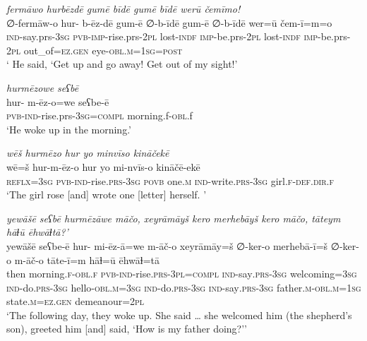 \ea \label{ŠJ.37}
\textit{fermāwo hurbēzdē gumē bīdē gumē bīdē werū čemīmo!} \\ 
\gll ∅-fermāw-o hur- b-ēz-dē gum-ē ∅-b-īdē gum-ē ∅-b-īdē wer=ū čem-ī=m=o \\ 
 \textsc{ind-}say.prs\textsc{-3sg} \textsc{pvb-}\textsc{imp-}rise.prs-\textsc{2pl} lost\textsc{-indf} \textsc{imp-}be.prs-\textsc{2pl} lost\textsc{-indf} \textsc{imp-}be.prs-\textsc{2pl} out\_of\textsc{=ez.gen} eye\textsc{-obl}\textsc{.m}\textsc{=\textsc{1sg}}\textsc{=\textsc{post}} \\ 
\glt ` He said, ‘Get up and go away! Get out of my sight!'
\z 
 
\ea \label{ŠJ.47}
\textit{hurmēzowe seʕbē} \\ 
\gll hur- m-ēz-o=we seʕbe-ē \\ 
 \textsc{pvb-}\textsc{ind-}rise.prs\textsc{-3sg}\textsc{=compl} morning.f\textsc{-obl}.f \\ 
\glt `He woke up in the morning.'
\z 
 
\ea \label{KŠ.79}
\textit{wēš hurmēzo hur yo minvīso kināčekē} \\ 
\gll wē=š hur-m-ēz-o hur yo mi-nvīs-o kināčē-ekē \\ 
 \textsc{reflx}\textsc{=3sg} \textsc{pvb-}\textsc{ind-}rise\textsc{.prs}\textsc{-3sg} \textsc{povb} one\textsc{.m} \textsc{ind-}write\textsc{.prs}\textsc{-3sg} girl\textsc{.f}\textsc{-def}\textsc{.dir}\textsc{.f} \\ 
\glt `The girl rose [and] wrote one [letter] herself. '
\z 
 
\ea \label{KŠ.81}
\textit{yewāšē seʕbē hurmēzāwe māčo, xeyrāmāyš kero merhebāyš kero māčo, tāteym hāɫū ēhwāɫtā?’} \\ 
\gll yewāšē seʕbe-ē hur- mi-ēz-ā=we m-āč-o xeyrāmāy=š ∅-ker-o merhebā-ī=š ∅-ker-o m-āč-o tāte-ī=m hāɫ=ū ēhwāɫ=tā \\ 
 then morning\textsc{.f}\textsc{-obl}\textsc{.f} \textsc{pvb-}\textsc{ind-}rise\textsc{.prs}\textsc{-3pl}\textsc{=compl} \textsc{ind-}say\textsc{.prs}\textsc{-3sg} welcoming\textsc{=3sg} \textsc{ind-}do\textsc{.prs}\textsc{-3sg} hello\textsc{-obl}\textsc{.m}\textsc{=3sg} \textsc{ind-}do\textsc{.prs}\textsc{-3sg} \textsc{ind-}say\textsc{.prs}\textsc{-3sg} father\textsc{.m}\textsc{-obl}\textsc{.m}\textsc{=\textsc{1sg}} state\textsc{.m}\textsc{\textsc{=ez.gen}} demeanour=\textsc{2pl} \\ 
\glt `The following day, they woke up. She said … she welcomed him (the shepherd’s son), greeted him [and] said, ‘How is my father doing?’'
\z 
 
